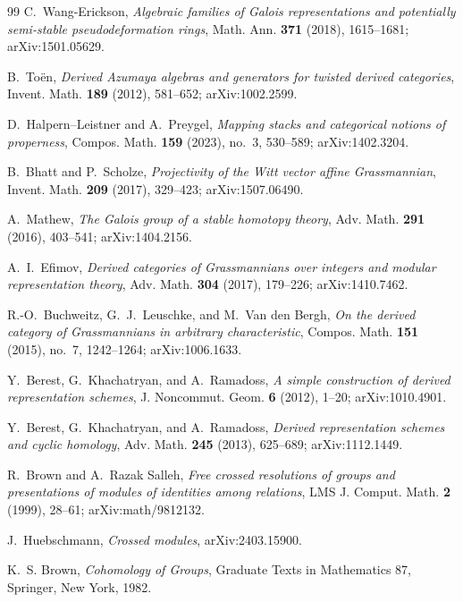 \documentclass[11pt]{article}
\theoremstyle{definition}
\begin{document}
\begin{thebibliography}{99}
C.~Wang-Erickson,
\emph{Algebraic families of Galois representations and potentially semi-stable pseudodeformation rings},
Math. Ann. \textbf{371} (2018), 1615--1681; arXiv:1501.05629.

B.~To\"en,
\emph{Derived Azumaya algebras and generators for twisted derived categories},
Invent. Math. \textbf{189} (2012), 581--652; arXiv:1002.2599.

D.~Halpern--Leistner and A.~Preygel,
\emph{Mapping stacks and categorical notions of properness},
Compos. Math. \textbf{159} (2023), no.~3, 530--589; arXiv:1402.3204.


B.~Bhatt and P.~Scholze,
\emph{Projectivity of the Witt vector affine Grassmannian},
Invent. Math. \textbf{209} (2017), 329--423; arXiv:1507.06490.

A.~Mathew,
\emph{The Galois group of a stable homotopy theory},
Adv. Math. \textbf{291} (2016), 403--541; arXiv:1404.2156.

A.~I.~Efimov,
\emph{Derived categories of Grassmannians over integers and modular representation theory},
Adv. Math. \textbf{304} (2017), 179--226; arXiv:1410.7462.

R.-O.~Buchweitz, G.~J.~Leuschke, and M.~Van den Bergh,
\emph{On the derived category of Grassmannians in arbitrary characteristic},
Compos. Math. \textbf{151} (2015), no.~7, 1242--1264; arXiv:1006.1633.

Y.~Berest, G.~Khachatryan, and A.~Ramadoss,
\emph{A simple construction of derived representation schemes},
J. Noncommut. Geom. \textbf{6} (2012), 1--20; arXiv:1010.4901.

Y.~Berest, G.~Khachatryan, and A.~Ramadoss,
\emph{Derived representation schemes and cyclic homology},
Adv. Math. \textbf{245} (2013), 625--689; arXiv:1112.1449.

R.~Brown and A.~Razak Salleh,
\emph{Free crossed resolutions of groups and presentations of modules of identities among relations},
LMS J. Comput. Math. \textbf{2} (1999), 28--61; arXiv:math/9812132.

J.~Huebschmann,
\emph{Crossed modules},
arXiv:2403.15900.

K.~S. Brown,
\emph{Cohomology of Groups},
Graduate Texts in Mathematics 87, Springer, New York, 1982.


\end{thebibliography}
\end{document}
